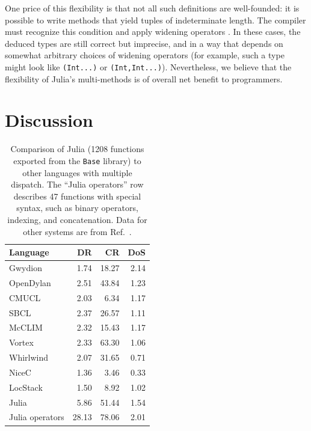 \documentclass[preprint]{sigplanconf}
\newcommand{\code}[1]{\texttt{#1}}
\begin{document}
One price of this flexibility is that not all such definitions are well-founded:
it is possible to write methods that yield tuples of indeterminate length.
The compiler must recognize this condition and apply widening operators
\cite{Cousot:1977, widening}. In these cases, the deduced types are
still correct but imprecise, and in a way that depends on somewhat arbitrary
choices of widening operators (for example, such a type might look
like \code{(Int...)} or \code{(Int,Int...)}). Nevertheless, we believe that the
flexibility of Julia's multi-methods is of overall net benefit to programmers.




\section{Discussion}

\begin{table}
\label{dispatchratios}
\begin{center}
\begin{tabular}{|l|r|r|r|}\hline
Language & DR & CR & DoS \\
\hline \hline
Gwydion    & 1.74 & 18.27 & 2.14 \\
\hline
OpenDylan  & 2.51 & 43.84 & 1.23 \\
\hline
CMUCL      & 2.03 &  6.34 & 1.17 \\
\hline
SBCL       & 2.37 & 26.57 & 1.11 \\
\hline
McCLIM     & 2.32 & 15.43 & 1.17 \\
\hline
Vortex     & 2.33 & 63.30 & 1.06 \\
\hline
Whirlwind  & 2.07 & 31.65 & 0.71 \\
\hline
NiceC      & 1.36 &  3.46 & 0.33 \\
\hline
LocStack   & 1.50 &  8.92 & 1.02 \\
\hline
Julia      & 5.86 & 51.44 & 1.54 \\
\hline
Julia operators & 28.13 & 78.06 & 2.01 \\
\hline
\end{tabular}
\end{center}
\caption{
Comparison of Julia (1208 functions exported from the \code{Base} library)
to other languages with multiple dispatch.
The ``Julia operators'' row describes 47 functions with special syntax, such as
binary operators, indexing, and concatenation.
Data for other systems are from Ref.~\cite{Muschevici:2008}.
}
\end{table}
\end{document}
